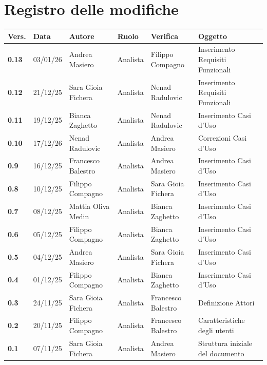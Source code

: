 \documentclass[a4paper,12pt]{article}
\begin{document}
    

    \section*{Registro delle modifiche} {
        \begin{table}[h!]
                \begin{tabularx}{\textwidth}{|l|l|l|l|L|L|}
                \hline
                \textbf{Vers.} & \textbf{Data} & \textbf{Autore} & \textbf{Ruolo} & \textbf{Verifica} & \textbf{Oggetto} \\
                \hline
                \textbf{0.13} & 03/01/26 & Andrea Masiero & Analista & Filippo Compagno & Inserimento Requisiti Funzionali \\
                \hline
                \textbf{0.12} & 21/12/25 &  Sara Gioia Fichera & Analista & Nenad Radulovic & Inserimento Requisiti Funzionali \\
                \hline
                \textbf{0.11} & 19/12/25 & Bianca Zaghetto & Analista & Nenad Radulovic & Inserimento Casi d'Uso \\
                \hline
                \textbf{0.10} & 17/12/26 & Nenad Radulovic & Analista & Andrea Masiero & Correzioni Casi d'Uso \\
                \hline
                \textbf{0.9} & 16/12/25 & Francesco Balestro & Analista & Andrea Masiero & Inserimento Casi d'Uso \\
                \hline
                \textbf{0.8} & 10/12/25 & Filippo Compagno & Analista & Sara Gioia Fichera & Inserimento Casi d'Uso \\
                \hline
                \textbf{0.7} & 08/12/25 & Mattia Oliva Medin & Analista & Bianca Zaghetto & Inserimento Casi d'Uso \\
                \hline
                \textbf{0.6} & 05/12/25 & Filippo Compagno & Analista & Bianca Zaghetto & Inserimento Casi d'Uso \\
                \hline
                \textbf{0.5} & 04/12/25 & Andrea Masiero & Analista & Sara Gioia Fichera & Inserimento Casi d'Uso \\
                \hline
                \textbf{0.4} & 01/12/25 & Filippo Compagno & Analista & Bianca Zaghetto & Inserimento Casi d'Uso \\
                \hline
                \textbf{0.3} & 24/11/25 & Sara Gioia Fichera & Analista & Francesco Balestro &  Definizione Attori \\
                \hline
                \textbf{0.2} & 20/11/25 & Filippo Compagno & Analista & Francesco Balestro & Caratteristiche degli utenti \\
                \hline
                \textbf{0.1} & 07/11/25 & Sara Gioia Fichera & Analista & Andrea Masiero & Struttura iniziale del documento \\
                \hline
            \end{tabularx}
        \end{table}
    }
    \newpage
    
\end{document}

